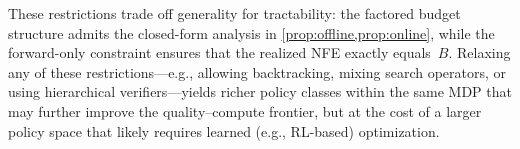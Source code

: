 These restrictions trade off generality for tractability: the factored
budget structure admits the closed-form analysis in
\cref{prop:offline,prop:online}, while the forward-only constraint
ensures that the realized NFE exactly equals~$B$.
Relaxing any of these restrictions---e.g., allowing backtracking,
mixing search operators, or using hierarchical verifiers---yields
richer policy classes within the same MDP that may further improve the
quality--compute frontier, but at the cost of a larger policy space
that likely requires learned (e.g., RL-based) optimization.
